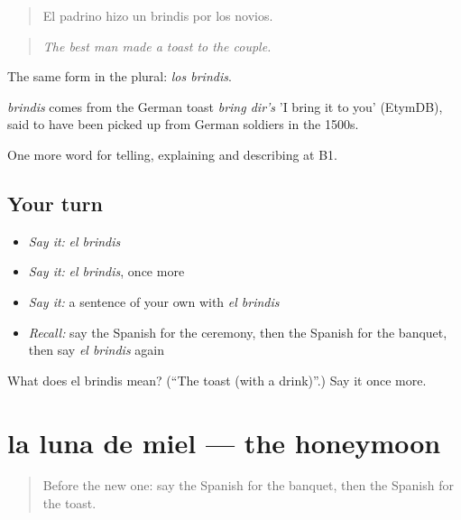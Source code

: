 \begin{quote}
El padrino hizo un brindis por los novios.
\end{quote}

\begin{quote}
\emph{The best man made a toast to the couple.}
\end{quote}

The same form in the plural: \emph{los brindis}.

\begin{cousinweb}
\emph{brindis} comes from the German toast \emph{bring dir's} 'I bring it to you' (EtymDB), said to have been picked up from German soldiers in the 1500s.
\end{cousinweb}

\begin{grammarlens}[title={What you've built}]
One more word for telling, explaining and describing at B1.
\end{grammarlens}

\subsection*{Your turn}
\begin{itemize}
\raggedright
  \item \emph{Say it:} \emph{el brindis}
  \item \emph{Say it:} \emph{el brindis}, once more
  \item \emph{Say it:} a sentence of your own with \emph{el brindis}
  \item \emph{Recall:} say the Spanish for the ceremony, then the Spanish for the banquet, then say \emph{el brindis} again
\end{itemize}

\begin{tcolorbox}[breakable,colback=teal!4,colframe=teal!35!black,title={Before you move on}]
What does el brindis mean? (\textquotedblleft{}The toast (with a drink)\textquotedblright{}.) Say it once more.
\end{tcolorbox}
\section[la luna de miel]{la luna de miel — the honeymoon}

\label{lesson:ES-C548-luna-de-miel}



\begin{quote}
Before the new one: say the Spanish for the banquet, then the Spanish for the toast.
\end{quote}

